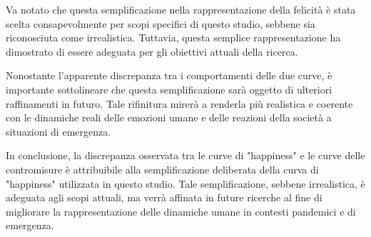 Va notato che questa semplificazione nella rappresentazione della 
felicità è stata scelta consapevolmente per scopi specifici di questo 
studio, sebbene sia riconosciuta come irrealistica. Tuttavia, questa 
semplice rappresentazione ha dimostrato di essere adeguata per gli 
obiettivi attuali della ricerca. 

Nonostante l'apparente discrepanza tra i comportamenti delle due curve, 
è importante sottolineare che questa semplificazione sarà oggetto di 
ulteriori raffinamenti in futuro. Tale rifinitura mirerà a renderla più 
realistica e coerente con le dinamiche reali delle emozioni umane e 
delle reazioni della società a situazioni di emergenza.

In conclusione, la discrepanza osservata tra le curve di "happiness" e 
le curve delle contromisure è attribuibile alla semplificazione 
deliberata della curva di "happiness" utilizzata in questo studio. 
Tale semplificazione, sebbene irrealistica, è adeguata agli scopi attuali, 
ma verrà affinata in future ricerche al fine di migliorare la 
rappresentazione delle dinamiche umane in contesti pandemici e di 
emergenza.